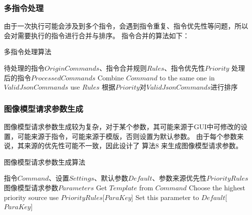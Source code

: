 \documentclass[a4paper,AutoFakeBold,oneside,12pt]{book}
\begin{document}
\subsubsection{多指令处理}
由于一次执行可能会涉及到多个指令，会遇到指令重复、指令优先性等问题，所以会对需要执行的指令进行合并与排序。
指令合并的算法如下：
\begin{algorithm} 
	\begin{spacing}{1.3}
		\caption{多指令处理算法} 
		\label{JsonCommandsProcessingAlgorithm}
		\renewcommand{\algorithmicrequire}{\textbf{输入：}}
		\renewcommand{\algorithmicensure}{\textbf{输出：}} 
			\begin{algorithmic}[1] 
				\Require 待处理的指令$OriginCommands$、指令合并规则$Rules$、指令优先性$Priority$
				\Ensure 处理后的指令$ProcessedCommands$
                        \State Combine $Command$ to the same one in $ValidJsonCommands$ use $Rules$
                    \EndIf
                \EndFor
                \State 根据$Priority$对$ValidJsonCommands$进行排序
			\end{algorithmic}
	\end{spacing}
\end{algorithm}

\subsubsection{图像模型请求参数生成}
图像模型请求参数生成较为复杂，对于某个参数，其可能来源于GUI中可修改的设置，可能来源于指令，可能来源于模版，否则设置为默认参数。
由于每个参数来说，其来源的优先性可能不一致，因此设计了 算法8 来生成图像模型请求参数。
\begin{algorithm} 
	\begin{spacing}{1.3}
		\caption{图像模型请求参数生成算法} 
		\label{ImageParasGenAlgorithm}
		\renewcommand{\algorithmicrequire}{\textbf{输入：}}
		\renewcommand{\algorithmicensure}{\textbf{输出：}} 
			\begin{algorithmic}[1] 
				\Require 指令$Command$、设置$Settings$、默认参数$Default$、参数来源优先性$PriorityRules$
				\Ensure 图像模型请求参数$Parameters$
                    \State Get $Template$ from $Command$
                        \State Choose the highest priority source use $PriorityRules$[$ParaKey$]
                    \Else
                        \State Set this parameter to $Default$[$ParaKey$]
                    \EndIf
                \EndFor
			\end{algorithmic}
	\end{spacing}
\end{algorithm}
\end{document}
